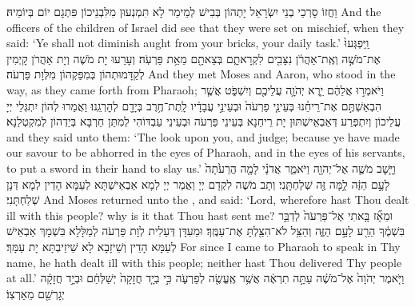 {וַחֲזוֹ סָרְכֵי בְנֵי יִשְׂרָאֵל יָתְהוֹן בְּבִישׁ לְמֵימַר לָא תִּמְנְעוּן מִלִּבְנֵיכוֹן פִּתְגָם יוֹם בְּיוֹמֵיהּ׃}
{And the officers of the children of Israel did see that they were set on mischief, when they said: ‘Ye shall not diminish aught from your bricks, your daily task.’}{}
{וַֽיִּפְגְּעוּ֙ אֶת־מֹשֶׁ֣ה וְאֶֽת־אַהֲרֹ֔ן נִצָּבִ֖ים לִקְרָאתָ֑ם בְּצֵאתָ֖ם מֵאֵ֥ת פַּרְעֹֽה׃
}
{וְעָרַעוּ יָת מֹשֶׁה וְיָת אַהֲרֹן קָיְמִין לְקַדָּמוּתְהוֹן בְּמִפַּקְהוֹן מִלְּוָת פַּרְעֹה׃}
{And they met Moses and Aaron, who stood in the way, as they came forth from Pharaoh;}{}
{וַיֹּאמְר֣וּ אֲלֵהֶ֔ם יֵ֧רֶא יְהֹוָ֛ה עֲלֵיכֶ֖ם וְיִשְׁפֹּ֑ט אֲשֶׁ֧ר הִבְאַשְׁתֶּ֣ם אֶת־רֵיחֵ֗נוּ בְּעֵינֵ֤י פַרְעֹה֙ וּבְעֵינֵ֣י עֲבָדָ֔יו לָֽתֶת־חֶ֥רֶב בְּיָדָ֖ם לְהׇרְגֵֽנוּ׃}
{וַאֲמַרוּ לְהוֹן יִתְגְּלֵי יְיָ עֲלֵיכוֹן וְיִתְפְּרַע דְּאַבְאֵישְׁתּוּן יָת רֵיחַנָא בְּעֵינֵי פַּרְעֹה וּבְעֵינֵי עַבְדּוֹהִי לְמִתַּן חַרְבָּא בְּיַדְהוֹן לְמִקְטְלַנָא׃}
{and they said unto them: ‘The \lord\space look upon you, and judge; because ye have made our savour to be abhorred in the eyes of Pharaoh, and in the eyes of his servants, to put a sword in their hand to slay us.’}{}
{וַיָּ֧שׇׁב מֹשֶׁ֛ה אֶל־יְהֹוָ֖ה וַיֹּאמַ֑ר אֲדֹנָ֗י לָמָ֤ה הֲרֵעֹ֙תָה֙ לָעָ֣ם הַזֶּ֔ה לָ֥מָּה זֶּ֖ה שְׁלַחְתָּֽנִי׃
}
{וְתָב מֹשֶׁה לִקְדָם יְיָ וַאֲמַר יְיָ לְמָא אַבְאֵישְׁתָּא לְעַמָּא הָדֵין לְמָא דְּנָן שְׁלַחְתָּנִי׃}
{And Moses returned unto the \lord, and said: ‘Lord, wherefore hast Thou dealt ill with this people? why is it that Thou hast sent me?}{}
{וּמֵאָ֞ז בָּ֤אתִי אֶל־פַּרְעֹה֙ לְדַבֵּ֣ר בִּשְׁמֶ֔ךָ הֵרַ֖ע לָעָ֣ם הַזֶּ֑ה וְהַצֵּ֥ל לֹא־הִצַּ֖לְתָּ אֶת־עַמֶּֽךָ׃
}
{וּמֵעִדָּן דְּעַלִית לְוָת פַּרְעֹה לְמַלָּלָא בִּשְׁמָךְ אַבְאֵישׁ לְעַמָּא הָדֵין וְשֵׁיזָבָא לָא שֵׁיזֵיבְתָּא יָת עַמָּךְ׃}
{For since I came to Pharaoh to speak in Thy name, he hath dealt ill with this people; neither hast Thou delivered Thy people at all.’}{}
\newperek
{}%
{וַיֹּ֤אמֶר יְהֹוָה֙ אֶל־מֹשֶׁ֔ה עַתָּ֣ה תִרְאֶ֔ה אֲשֶׁ֥ר אֶֽעֱשֶׂ֖ה לְפַרְעֹ֑ה כִּ֣י בְיָ֤ד חֲזָקָה֙ יְשַׁלְּחֵ֔ם וּבְיָ֣ד חֲזָקָ֔ה יְגָרְשֵׁ֖ם מֵאַרְצֽוֹ׃ \setuma         
}
